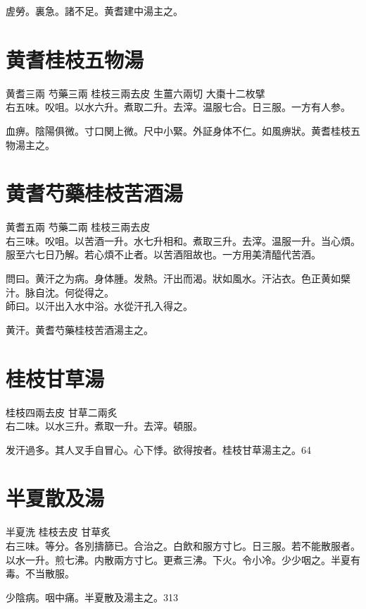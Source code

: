 虗勞。裏急。諸不足。黄耆建中湯主之。

\section{黄耆桂枝五物湯}

黄耆{\scriptsize 三兩} 芍藥{\scriptsize 三兩} 桂枝{\scriptsize 三兩去皮} 生薑{\scriptsize 六兩切} 大棗{\scriptsize 十二枚擘}\\
右五味。㕮咀。以水六升。煮取二升。去滓。温服七合。日三服。{\scriptsize 一方有人参。}

血痹。陰陽俱微。寸口関上微。尺中小緊。外証身体不仁。如風痹狀。黄耆桂枝五物湯主之。

\section{黄耆芍藥桂枝苦酒湯}

黄耆{\scriptsize 五兩} 芍藥{\scriptsize 二兩} 桂枝{\scriptsize 三兩去皮}\\
右三味。㕮咀。以苦酒一升。水七升相和。煮取三升。去滓。温服一升。当心煩。服至六七日乃解。若心煩不止者。以苦酒阻故也。{\scriptsize 一方用美清醯代苦酒。}

問曰。黄汗之为病。身体腫。发熱。汗出而渴。狀如風水。汗沾衣。色正黄如檗汁。脉自沈。何從得之。\\
師曰。以汗出入水中浴。水從汗孔入得之。

黄汗。黄耆芍藥桂枝苦酒湯主之。

\section{桂枝甘草湯}

桂枝{\scriptsize 四兩去皮} 甘草{\scriptsize 二兩炙}\\
右二味。以水三升。煮取一升。去滓。頓服。

发汗過多。其人叉手自冒心。心下悸。欲得按者。桂枝甘草湯主之。64

\section{半夏散及湯}

半夏{\scriptsize 洗} 桂枝{\scriptsize 去皮} 甘草{\scriptsize 炙}\\
右三味。等分。各別擣篩已。合治之。白飲和服方寸匕。日三服。若不能散服者。以水一升。煎七沸。内散兩方寸匕。更煮三沸。下火。令小冷。少少咽之。半夏有毒。不当散服。

少陰病。咽中痛。半夏散及湯主之。313

